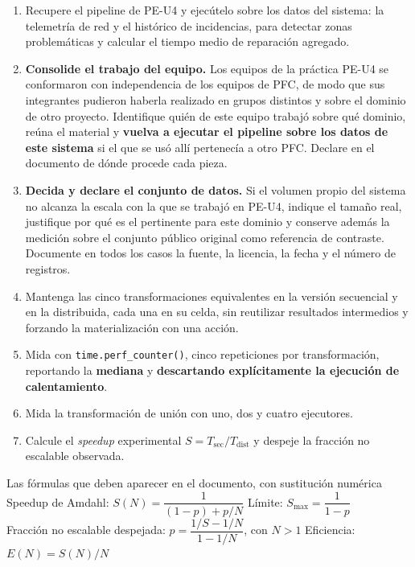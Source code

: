 \documentclass[11pt,a4paper]{article}
\begin{document}
	\begin{enumerate}[leftmargin=*,itemsep=4pt]
		\item Recupere el pipeline de PE-U4 y ejecútelo sobre los datos del sistema: la telemetría de red y el histórico de incidencias, para detectar zonas problemáticas y calcular el tiempo medio de reparación agregado.
		\item \textbf{Consolide el trabajo del equipo.} Los equipos de la práctica PE-U4 se conformaron con independencia de los equipos de PFC, de modo que sus integrantes pudieron haberla realizado en grupos distintos y sobre el dominio de otro proyecto. Identifique quién de este equipo trabajó sobre qué dominio, reúna el material y \textbf{vuelva a ejecutar el pipeline sobre los datos de este sistema} si el que se usó allí pertenecía a otro PFC. Declare en el documento de dónde procede cada pieza.
		\item \textbf{Decida y declare el conjunto de datos.} Si el volumen propio del sistema no alcanza la escala con la que se trabajó en PE-U4, indique el tamaño real, justifique por qué es el pertinente para este dominio y conserve además la medición sobre el conjunto público original como referencia de contraste. Documente en todos los casos la fuente, la licencia, la fecha y el número de registros.
		\item Mantenga las cinco transformaciones equivalentes en la versión secuencial y en la distribuida, cada una en su celda, sin reutilizar resultados intermedios y forzando la materialización con una acción.
		\item Mida con \texttt{time.perf\_counter()}, cinco repeticiones por transformación, reportando la \textbf{mediana} y \textbf{descartando explícitamente la ejecución de calentamiento}.
		\item Mida la transformación de unión con uno, dos y cuatro ejecutores.
		\item Calcule el \emph{speedup} experimental $S = T_{\text{sec}} / T_{\text{dist}}$ y despeje la fracción no escalable observada.
	\end{enumerate}
	
	\begin{defBox}{Las fórmulas que deben aparecer en el documento, con sustitución numérica}
		Speedup de Amdahl: $S(N) = \dfrac{1}{(1-p) + p/N}$ \qquad Límite: $S_{\max} = \dfrac{1}{1-p}$\\[4pt]
		Fracción no escalable despejada: $p = \dfrac{1/S - 1/N}{1 - 1/N}$, con $N>1$ \qquad Eficiencia: $E(N) = S(N)/N$
	\end{defBox}
	
\end{document}
